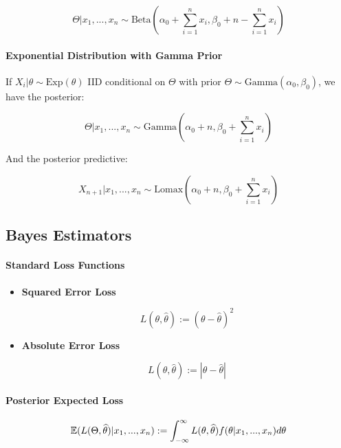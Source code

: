 \documentclass[a4paper]{article}
\begin{document}
                \[
                    \Theta | x_1, ..., x_n \sim \text{Beta}\left(\alpha_0 +
                    \sum_{i=1}^n x_i, \beta_0 + n - \sum_{i=1}^n x_i\right)
                \]

            \paragraph{Exponential Distribution with Gamma Prior}
                If $X_i | \theta \sim \text{Exp}(\theta)$ IID conditional on
                $\Theta$ with prior $\Theta \sim \text{Gamma}(\alpha_0,
                \beta_0)$, we have the posterior:

                \[
                    \Theta | x_1, ..., x_n \sim \text{Gamma}\left(\alpha_0 + n,
                    \beta_0 + \sum_{i=1}^n x_i\right)
                \]

                And the posterior predictive:

                \[
                    X_{n+1} | x_1, ..., x_n \sim \text{Lomax}\left(\alpha_0 + n,
                    \beta_0 + \sum_{i=1}^n x_i\right)
                \]

        \subsection*{Bayes Estimators}
            \paragraph{Standard Loss Functions}
                \begin{itemize}
                    \item \textbf{Squared Error Loss}

                        \[
                            L(\theta, \widehat \theta) := (\theta - \widehat
                            \theta)^2
                        \]
                    \item \textbf{Absolute Error Loss}

                        \[
                            L(\theta, \widehat \theta) := |\theta - \widehat
                            \theta|
                        \]
                \end{itemize}

            \paragraph{Posterior Expected Loss}
                \[
                    \mathbb{E}(L(\Theta, \widehat \theta) | x_1, ..., x_n) :=
                    \int_{-\infty}^\infty L(\theta, \widehat \theta) f(\theta |
                    x_1, ..., x_n) d\theta
                \]
\end{document}
